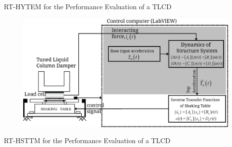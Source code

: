 \documentclass[usepdftitle=false]{beamer}
\begin{document}
\begin{frame}{RT-HYTEM for the Performance Evaluation of a TLCD}
\begin{figure}[ht]
\centering
\setcounter{subfigure}{0}
\includegraphics[width=1\textwidth] {figure/4-3.eps}
\label{fig:4-3}
\end{figure}
\end{frame}

\begin{frame}{RT-HSTTM for the Performance Evaluation of a TLCD}
\begin{figure}[!ht]
\centering
\setcounter{subfigure}{0}
\label{fig:4-4}
\end{figure}
\end{frame}
\end{document}
